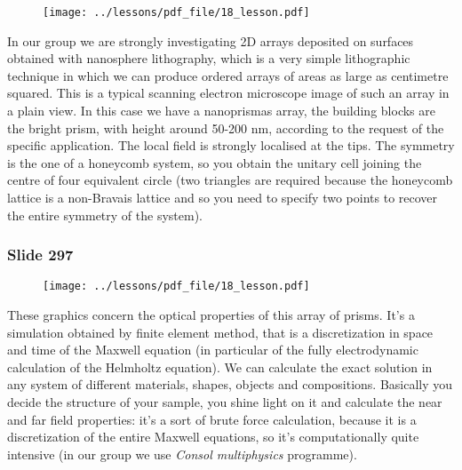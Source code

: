 \documentclass[../main/main.tex]{subfiles}
\begin{document}
\begin{figure}[h!]
\centering
\texttt{[image: ../lessons/pdf\_file/18\_lesson.pdf]}
\end{figure}

In our group we are strongly investigating 2D arrays deposited on surfaces obtained with nanosphere lithography, which is a very simple lithographic technique in which we can produce ordered arrays of areas as large as centimetre squared.
This is a typical scanning electron microscope image of such an array in a plain view. 
In this case we have a nanoprismas array, the building blocks are the bright prism, with height around 50-200 nm, according to the request of the specific application. 
The local field is strongly localised at the tips.
The symmetry is the one of a honeycomb system, so you obtain the unitary cell joining the centre of four equivalent circle (two triangles are required because the honeycomb lattice is a non-Bravais lattice and so you need to specify two points to recover the entire symmetry of the system).

\newpage

\subsubsection{Slide 297}

\begin{figure}[h!]
\centering
\texttt{[image: ../lessons/pdf\_file/18\_lesson.pdf]}
\end{figure}

These graphics concern the optical properties of this array of prisms. 
It’s a simulation obtained by finite element method, that is a discretization in space and time of the Maxwell equation (in particular of the fully electrodynamic calculation of the Helmholtz equation).
We can calculate the exact solution in any system of different materials, shapes, objects and compositions.
Basically you decide the structure of your sample, you shine light on it and calculate the near and far field properties: it's a sort of brute force calculation, because it is a discretization of the entire Maxwell equations, so it's computationally quite intensive (in our group we use \textit{Consol multiphysics} programme).
\end{document}
